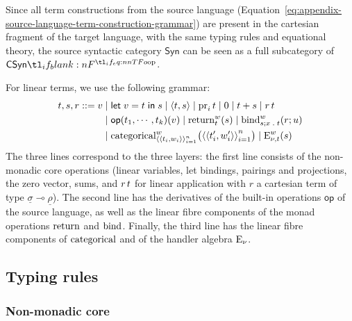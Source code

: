 \documentclass[11pt,a4paper]{article}
\theoremstyle{definition}
\theoremstyle{remark}
\providecommand{\Syn}{\mathsf{Syn}}
\providecommand{\srcop}{\mathsf{op}}
\providecommand{\tgtop}{\mathsf{op}}
\providecommand{\letst}[3]{\mathsf{let}\;#1=#2\;\mathsf{in}\;#3}
\providecommand{\lintype}[1]{\underline{#1}}
\providecommand{\linto}{\multimap}
\begin{document}
Since all term constructions from the source language (Equation~\eqref{eq:appendix-source-language-term-construction-grammar}) are present in the cartesian fragment of the target language, with the same typing rules and equational theory, the source syntactic category \( \Syn \) can be seen as a full subcategory of \( \CSyn \).

For linear terms, we use the following grammar:
\begin{equation}
  \label{eq:appendix-target-language-linear-term-construction-grammar}
  \begin{aligned}
    t, s, r
    ::=
    v
    &\mid
      \letst{v}{t}{s}
      \mid
      \tuple{ t, s }
      \mid
      \opn[b]{pr}_{i} t
      \mid
      \opn[b]{0}
      \mid
      t + s
      \mid
      \linapp{r}{t}
    \\
    &
      \mid
      \fn[n]{ \fn[n]{ \tgtop }{ t_{1}, \cdots, t_{k} } }{v}
      \mid
      \fn[n]{ \opn[b]{return}^{w}_{t} }{s}
      \mid
      \fn[n]{ \opn[b]{bind}^{w}_{s; x \; . \; t} }{r; u}
    \\
    &
      \mid
      \fn[n]{ \opn[b]{categorical}^{w}_{\tuple{ \tuple{ t_{i}, w_{i} } }_{i = 1}^{n}} }{
      \tuple{ \tuple{ t_{i}', w_{i}' } }_{i = 1}^{n}
      }
      \mid
      \fn[n]{ \opn[b]{E}^{w}_{\nu, t} }{ s }
  \end{aligned}
\end{equation}
The three lines correspond to the three layers: the first line consists of the non-monadic core operations (linear variables, let bindings, pairings and projections, the zero vector, sums, and \( r\, t \) for linear application with \( r \) a cartesian term of type \( \lintype{\sigma} \linto \lintype{\rho} \)). The second line has the derivatives of the built-in operations \( \srcop \) of the source language, as well as the linear fibre components of the monad operations \( \opn[b]{return} \) and \( \opn[b]{bind} \). Finally, the third line has the linear fibre components of \( \opn[b]{categorical} \) and of the handler algebra \( \opn[b]{E}_{\nu} \).

\subsection{Typing rules}
\subsubsection{Non-monadic core}
\end{document}
